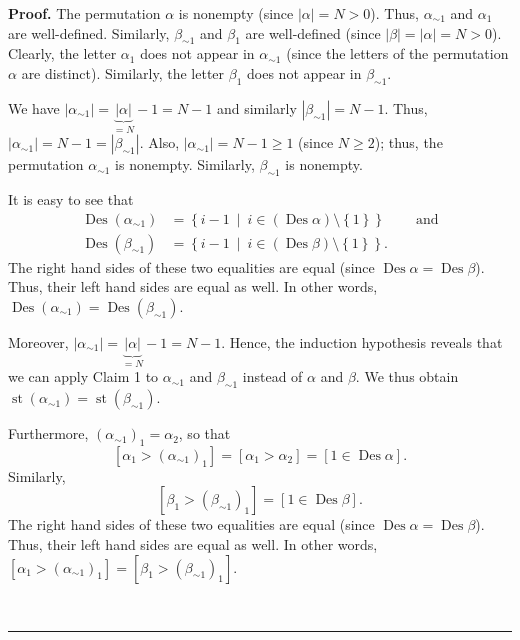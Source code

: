 \documentclass[numbers=enddot,12pt,final,onecolumn,notitlepage]{scrartcl}%
\theoremstyle{definition}
\newenvironment{proof}[1][Proof]{\noindent\textbf{#1.} }{\ \rule{0.5em}{0.5em}}
\newenvironment{verlong}{}{}
\begin{document}
\begin{verlong}
\begin{proof}
The permutation $\alpha$ is nonempty (since $\left\vert \alpha\right\vert
=N>0$). Thus, $\alpha_{\sim1}$ and $\alpha_{1}$ are well-defined. Similarly,
$\beta_{\sim1}$ and $\beta_{1}$ are well-defined (since $\left\vert
\beta\right\vert =\left\vert \alpha\right\vert =N>0$). Clearly, the letter
$\alpha_{1}$ does not appear in $\alpha_{\sim1}$ (since the letters of the
permutation $\alpha$ are distinct). Similarly, the letter $\beta_{1}$ does not
appear in $\beta_{\sim1}$.

We have $\left\vert \alpha_{\sim1}\right\vert =\underbrace{\left\vert
\alpha\right\vert }_{=N}-1=N-1$ and similarly $\left\vert \beta_{\sim
1}\right\vert =N-1$. Thus, $\left\vert \alpha_{\sim1}\right\vert
=N-1=\left\vert \beta_{\sim1}\right\vert $. Also, $\left\vert \alpha_{\sim
1}\right\vert =N-1\geq1$ (since $N\geq2$); thus, the permutation $\alpha
_{\sim1}$ is nonempty. Similarly, $\beta_{\sim1}$ is nonempty.

It is easy to see that
\begin{align*}
\operatorname*{Des}\left(  \alpha_{\sim1}\right)   &  =\left\{  i-1\ \mid
\ i\in\left(  \operatorname*{Des}\alpha\right)  \setminus\left\{  1\right\}
\right\}  \ \ \ \ \ \ \ \ \ \ \text{and}\\
\operatorname*{Des}\left(  \beta_{\sim1}\right)   &  =\left\{  i-1\ \mid
\ i\in\left(  \operatorname*{Des}\beta\right)  \setminus\left\{  1\right\}
\right\}  .
\end{align*}
The right hand sides of these two equalities are equal (since
$\operatorname*{Des}\alpha=\operatorname*{Des}\beta$). Thus, their left hand
sides are equal as well. In other words, $\operatorname*{Des}\left(
\alpha_{\sim1}\right)  =\operatorname*{Des}\left(  \beta_{\sim1}\right)  $.

Moreover, $\left\vert \alpha_{\sim1}\right\vert =\underbrace{\left\vert
\alpha\right\vert }_{=N}-1=N-1$. Hence, the induction hypothesis reveals that
we can apply Claim 1 to $\alpha_{\sim1}$ and $\beta_{\sim1}$ instead of
$\alpha$ and $\beta$. We thus obtain $\operatorname*{st}\left(  \alpha_{\sim
1}\right)  =\operatorname*{st}\left(  \beta_{\sim1}\right)  $.

Furthermore, $\left(  \alpha_{\sim1}\right)  _{1}=\alpha_{2}$, so that
\[
\left[  \alpha_{1}>\left(  \alpha_{\sim1}\right)  _{1}\right]  =\left[
\alpha_{1}>\alpha_{2}\right]  =\left[  1\in\operatorname*{Des}\alpha\right]
.
\]
Similarly,%
\[
\left[  \beta_{1}>\left(  \beta_{\sim1}\right)  _{1}\right]  =\left[
1\in\operatorname*{Des}\beta\right]  .
\]
The right hand sides of these two equalities are equal (since
$\operatorname*{Des}\alpha=\operatorname*{Des}\beta$). Thus, their left hand
sides are equal as well. In other words, $\left[  \alpha_{1}>\left(
\alpha_{\sim1}\right)  _{1}\right]  =\left[  \beta_{1}>\left(  \beta_{\sim
1}\right)  _{1}\right]  $.


\end{proof}
\end{verlong}
\end{document}
